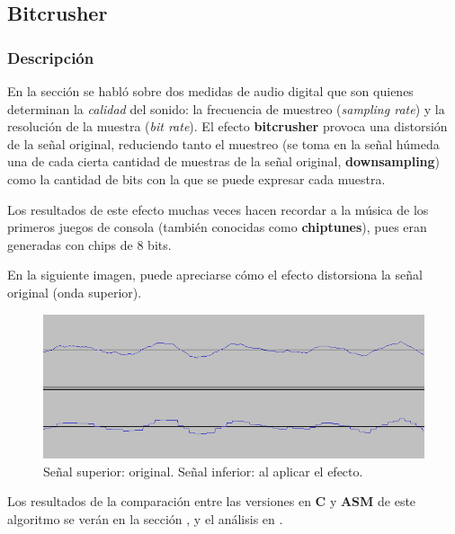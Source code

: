 \subsection{Bitcrusher}
\label{subsec:desarrollo-bitcrusher}

\subsubsection{Descripción}
\label{subsec:desarrollo-bitcrusher-desc}
En la sección  se habló sobre dos medidas de audio digital que son quienes determinan la \textit{calidad} del sonido: la frecuencia de muestreo (\textit{sampling rate}) y la resolución de la muestra (\textit{bit rate}). El efecto \textbf{bitcrusher} provoca una distorsión de la señal original, reduciendo tanto el muestreo (se toma en la señal húmeda una de cada cierta cantidad de muestras de la señal original, \textbf{downsampling}) como la cantidad de bits con la que se puede expresar cada muestra.

Los resultados de este efecto muchas veces hacen recordar a la música de los primeros juegos de consola (también conocidas como \textbf{chiptunes}), pues eran generadas con chips de 8 bits.

En la siguiente imagen, puede apreciarse cómo el efecto distorsiona la señal original (onda superior).

\begin{figure}[H]
    \centering
    \includegraphics[scale=0.6]{imagenes/bitcrusher-signal.png}
    \caption{Señal superior: original. Señal inferior: al aplicar el efecto.}
    \label{fig:bitcrusher-signals}
\end{figure}


\vspace{\baselineskip}

Los resultados de la comparación entre las versiones en \textbf{C} y \textbf{ASM} de este algoritmo se verán en la sección , y el análisis en .

